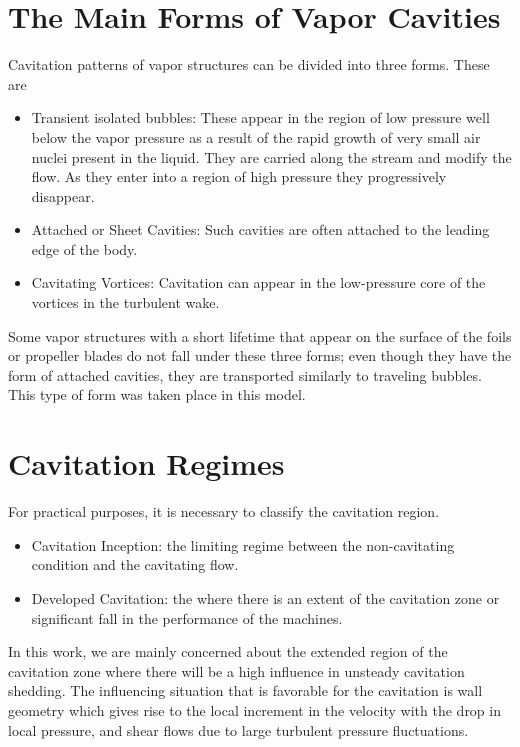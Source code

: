 \section{The Main Forms of Vapor Cavities}
Cavitation patterns of vapor structures can be divided into three
forms. These are

\begin{itemize}
\item Transient isolated bubbles: These appear in the region of low
  pressure well below the vapor pressure as a result of the rapid
  growth of very small air nuclei present in the liquid. They are
  carried along the stream and modify the flow. As they enter into a
  region of high pressure they progressively disappear.
\item Attached or Sheet Cavities: Such cavities are often attached to
  the leading edge of the body.
\item Cavitating Vortices: Cavitation can appear in the low-pressure
  core of the vortices in the turbulent wake.
\end{itemize}

Some vapor structures with a short lifetime that appear on the surface
of the foils or propeller blades do not fall under these three forms;
even though they have the form of attached cavities, they are
transported similarly to traveling bubbles. This type of form was
taken place in this model.\\

\section{Cavitation Regimes}
For practical purposes, it is necessary to classify the cavitation
region.

\begin{itemize}
\item Cavitation Inception: the limiting regime between the
  non-cavitating condition and the cavitating flow.
\item Developed Cavitation: the where there is an extent of the
  cavitation zone or significant fall in the performance of the
  machines.
\end{itemize}

In this work, we are mainly concerned about the extended region of the
cavitation zone where there will be a high influence in unsteady
cavitation shedding. The influencing situation that is favorable for
the cavitation is wall geometry which gives rise to the local
increment in the velocity with the drop in local pressure, and shear
flows due to large turbulent pressure fluctuations.\\

